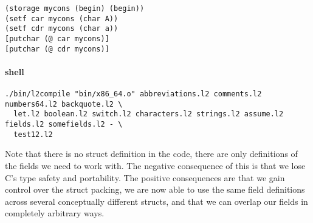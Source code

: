 \documentclass[]{article}
\let\oldparagraph\paragraph
\renewcommand{\paragraph}[1]{\oldparagraph{#1}\mbox{}}
\begin{document}
\begin{verbatim}
(storage mycons (begin) (begin))
(setf car mycons (char A))
(setf cdr mycons (char a))
[putchar (@ car mycons)]
[putchar (@ cdr mycons)]
\end{verbatim}

\paragraph{shell}\label{shell-11}

\begin{verbatim}
./bin/l2compile "bin/x86_64.o" abbreviations.l2 comments.l2 numbers64.l2 backquote.l2 \
  let.l2 boolean.l2 switch.l2 characters.l2 strings.l2 assume.l2 fields.l2 somefields.l2 - \
  test12.l2
\end{verbatim}

Note that there is no struct definition in the code, there are only
definitions of the fields we need to work with. The negative consequence
of this is that we lose C's type safety and portability. The positive
consequences are that we gain control over the struct packing, we are
now able to use the same field definitions across several conceptually
different structs, and that we can overlap our fields in completely
arbitrary ways.
\end{document}

